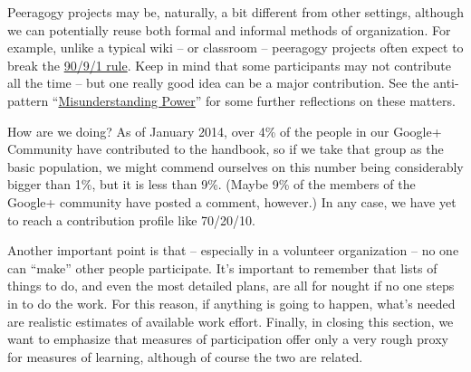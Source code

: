 Peeragogy projects may be, naturally, a bit different from other
settings, although we can potentially reuse both formal and informal
methods of organization. For example, unlike a typical wiki -- or
classroom -- peeragogy projects often expect to break the
\href{http://en.wikipedia.org/wiki/1\%25\_rule\_\%28Internet\_culture\%29}{90/9/1
rule}. Keep in mind that some participants may not contribute all the
time -- but one really good idea can be a major contribution. See the
anti-pattern
``\href{http://peeragogy.org/practice/antipatterns/misunderstanding-power/}{Misunderstanding
Power}'' for some further reflections on these matters.

How are we doing? As of January 2014, over 4\% of the people in our
Google+ Community have contributed to the handbook, so if we take that
group as the basic population, we might commend ourselves on this number
being considerably bigger than 1\%, but it is less than 9\%. (Maybe 9\%
of the members of the Google+ community have posted a comment, however.)
In any case, we have yet to reach a contribution profile like 70/20/10.

Another important point is that -- especially in a volunteer
organization -- no one can ``make'' other people participate. It's
important to remember that lists of things to do, and even the most
detailed plans, are all for nought if no one steps in to do the work.
For this reason, if anything is going to happen, what's needed are
realistic estimates of available work effort. Finally, in closing this
section, we want to emphasize that measures of participation offer only
a very rough proxy for measures of learning, although of course the two
are related.
